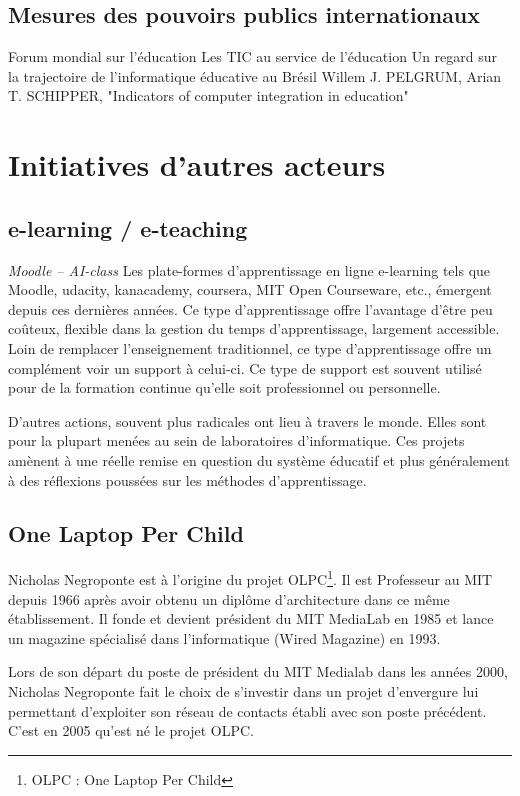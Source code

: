 \section{Mesures des pouvoirs publics internationaux}
Forum mondial sur l’éducation \cite{educ_forum}
Les TIC au service de l’éducation \cite{tics}
Un regard sur la trajectoire de l’informatique éducative au Brésil \cite{peixoto2006regard}
Willem J. PELGRUM, Arian T. SCHIPPER, "Indicators of computer integration in education" \cite{pelgrum1993indicators}


\chapter{Initiatives d'autres acteurs}
\label{chap:initialivesautres}

\section{e-learning / e-teaching}
\textit{Moodle -- AI-class}
Les plate-formes d'apprentissage en ligne \og{}e-learning\fg{} tels
que Moodle, udacity, kanacademy, coursera, MIT Open Courseware, etc.,
émergent depuis ces dernières années. Ce type d'apprentissage offre l'avantage d'être peu
coûteux, flexible dans la gestion du temps d'apprentissage, largement
accessible. Loin de remplacer l'enseignement traditionnel, ce type
d'apprentissage offre un complément voir un support à celui-ci. Ce
type de support est souvent utilisé pour de la formation continue
qu'elle soit professionnel ou personnelle.

D'autres actions, souvent plus radicales ont lieu à travers le monde. Elles sont pour la plupart menées au sein de laboratoires d'informatique. Ces projets amènent à une réelle remise en question du système éducatif et plus généralement à des réflexions poussées sur les méthodes d'apprentissage.

\section{One Laptop Per Child}

Nicholas Negroponte est à l'origine du projet OLPC\footnote{OLPC : One Laptop Per Child}. Il est Professeur au MIT depuis 1966 après avoir obtenu un diplôme d'architecture dans ce même établissement. Il fonde et devient président du MIT MediaLab en 1985 et lance un magazine spécialisé dans l'informatique (Wired Magazine) en 1993.

Lors de son départ du poste de président du MIT Medialab dans les années 2000, Nicholas Negroponte fait le choix de s'investir dans un projet d'envergure lui permettant d'exploiter son réseau de contacts établi avec son poste précédent. C'est en 2005 qu'est né le projet OLPC.

